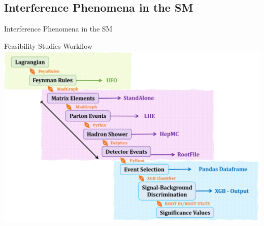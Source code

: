 \documentclass{../bredelebeamer}
\begin{document}
\subsection{Interference Phenomena in the SM}
\begin{frame}{Interference Phenomena in the SM}
    
\end{frame}





	


	

\begin{frame}{Feasibility Studies Workflow}
	\includegraphics[width=1.0\linewidth]{../2023_paper/Workflow.png}
\end{frame}
\end{document}
